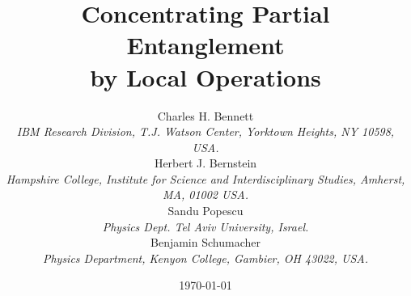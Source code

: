
 
 
 
\newcommand\Tr{\mbox{\rm Tr}}
\newcommand{\beq}{\begin{equation}}
\newcommand{\eeq}{\end{equation}}
\newcommand{\half}{\mbox{$\textstyle \frac{1}{2}$} }
\newcommand{\ket}[1]{\left | \, #1 \right \rangle}
\newcommand{\mod}{\mbox{\rm mod}}
\newcommand{\bra}[1]{\left \langle #1 \, \right |}
\newcommand{\proj}[1]{\ket{#1}\!\!\bra{#1}}
\renewcommand{\choose}[2]{{{#1}\atopwithdelims(){#2}}}
 
 
\title{Concentrating Partial Entanglement \\ by Local Operations}
\author{Charles H. Bennett \\
{\protect\small\sl IBM Research Division, T.J. Watson Center,
Yorktown Heights, NY 10598, USA.} \\
Herbert J. Bernstein \\
{\protect\small\sl Hampshire College, Institute for Science and
Interdisciplinary Studies,
Amherst, MA, 01002 USA.} \\
Sandu Popescu \\
{\protect\small\sl
Physics Dept. Tel Aviv University, Israel.} \\
Benjamin Schumacher \\
{\protect\small\sl Physics Department, Kenyon College, Gambier,
OH 43022, USA.}}
 
\date{\today}
 

